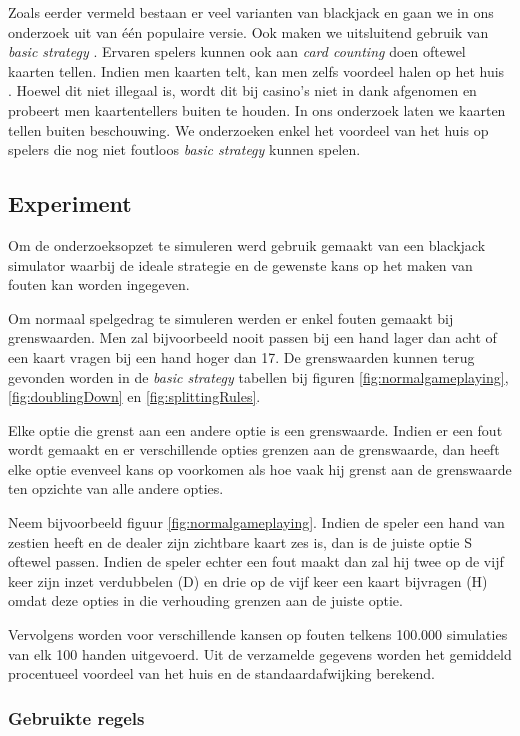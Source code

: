 \documentclass[conference]{IEEEtran}
\begin{document}
Zoals eerder vermeld bestaan er veel varianten van blackjack en gaan we in ons onderzoek uit van \'e\'en populaire versie. Ook maken we uitsluitend gebruik van \textit{basic strategy} \cite{thorp1961favorable}. Ervaren spelers kunnen ook aan \textit{card counting} doen oftewel kaarten tellen. Indien men kaarten telt, kan men zelfs voordeel halen op het huis \cite{fogel2004evolving}. Hoewel dit niet illegaal is, wordt dit bij casino's niet in dank afgenomen en probeert men kaartentellers buiten te houden. In ons onderzoek laten we kaarten tellen buiten beschouwing. We onderzoeken enkel het voordeel van het huis op spelers die nog niet foutloos \textit{basic strategy} kunnen spelen.

\subsection{Experiment}
Om de onderzoeksopzet te simuleren werd gebruik gemaakt van een blackjack simulator waarbij de ideale strategie en de gewenste kans op het maken van fouten kan worden ingegeven. 

Om normaal spelgedrag te simuleren werden er enkel fouten gemaakt bij grenswaarden. Men zal bijvoorbeeld nooit passen bij een hand lager dan acht of een kaart vragen bij een hand hoger dan 17. De grenswaarden kunnen terug gevonden worden in de \textit{basic strategy} tabellen bij figuren \ref{fig:normalgameplaying}, \ref{fig:doublingDown} en \ref{fig:splittingRules}. 

Elke optie die grenst aan een andere optie is een grenswaarde. Indien er een fout wordt gemaakt en er verschillende opties grenzen aan de grenswaarde, dan heeft elke optie evenveel kans op voorkomen als hoe vaak hij grenst aan de grenswaarde ten opzichte van alle andere opties. 

Neem bijvoorbeeld figuur \ref{fig:normalgameplaying}. Indien de speler een hand van zestien heeft en de dealer zijn zichtbare kaart zes is, dan is de juiste optie S oftewel passen. Indien de speler echter een fout maakt dan zal hij twee op de vijf keer zijn inzet verdubbelen (D) en drie op de vijf keer een kaart bijvragen (H) omdat deze opties in die verhouding grenzen aan de juiste optie.

Vervolgens worden voor verschillende kansen op fouten telkens 100.000 simulaties van elk 100 handen uitgevoerd. Uit de verzamelde gegevens worden het gemiddeld procentueel voordeel van het huis en de standaardafwijking berekend.

\subsubsection*{Gebruikte regels}
\end{document}
